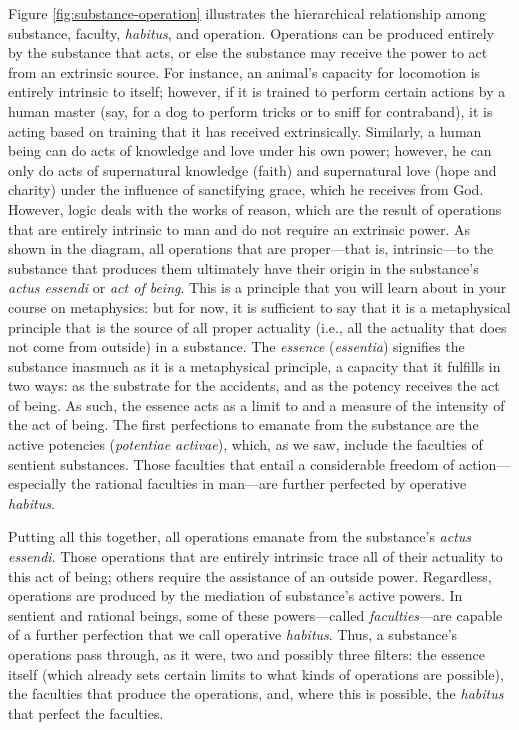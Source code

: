 \documentclass[article,12pt,a4paper,oneside]{memoir}
\begin{document}
    Figure \ref{fig:substance-operation} illustrates the hierarchical
    relationship among substance, faculty, \emph{habitus}, and
    operation. Operations can be produced entirely by the substance that
    acts, or else the substance may receive the power to act from an
    extrinsic source. For instance, an animal's capacity for locomotion
    is entirely intrinsic to itself; however, if it is trained to
    perform certain actions by a human master (say, for a dog to perform
    tricks or to sniff for contraband), it is acting based on training
    that it has received extrinsically. Similarly, a human being can do
    acts of knowledge and love under his own power; however, he can only
    do acts of supernatural knowledge (faith) and supernatural love
    (hope and charity) under the influence of sanctifying grace, which
    he receives from God. However, logic deals with the works of reason,
    which are the result of operations that are entirely intrinsic to
    man and do not require an extrinsic power. As shown in the diagram,
    all operations that are proper---that is, intrinsic---to the
    substance that produces them ultimately have their origin in the
    substance's \emph{actus essendi} or \emph{act of being}. This is a
    principle that you will learn about in your course on metaphysics:
    but for now, it is sufficient to say that it is a metaphysical
    principle that is the source of all proper actuality (i.e., all the
    actuality that does not come from outside) in a substance. The
    \emph{essence} (\emph{essentia}) signifies the substance inasmuch as
    it is a metaphysical principle, a capacity that it fulfills in two
    ways: as the substrate for the accidents, and as the potency
    receives the act of being. As such, the essence acts as a limit to
    and a measure of the intensity of the act of being. The first
    perfections to emanate from the substance are the active potencies
    (\emph{potentiae activae}), which, as we saw, include the faculties
    of sentient substances. Those faculties that entail a considerable
    freedom of action---especially the rational faculties in man---are
    further perfected by operative \emph{habitus}.

    Putting all this together, all operations emanate from the
    substance's \emph{actus essendi}. Those operations that are entirely
    intrinsic trace all of their actuality to this act of being; others
    require the assistance of an outside power. Regardless, operations
    are produced by the mediation of substance's active powers. In
    sentient and rational beings, some of these powers---called
    \emph{faculties}---are capable of a further perfection that we call
    operative \emph{habitus}. Thus, a substance's operations pass
    through, as it were, two and possibly three filters: the essence
    itself (which already sets certain limits to what kinds of
    operations are possible), the faculties that produce the operations,
    and, where this is possible, the \emph{habitus} that perfect the
    faculties.
\end{document}
